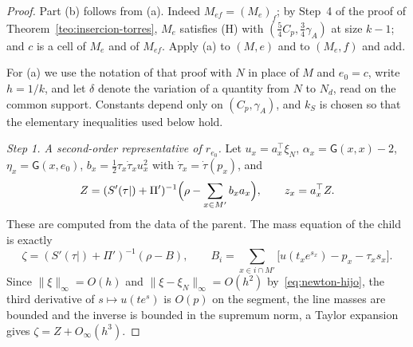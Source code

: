 \begin{proof}
Part (b) follows from (a). Indeed $M_{ef}=(M_e)_f$; by Step~4 of the proof of
Theorem~\ref{teo:insercion-torres}, $M_e$ satisfies \textup{(H)} with $(\tfrac54C_p,\tfrac34\gamma_A)$ at
size $k-1$; and $c$ is a cell of $M_e$ and of $M_{ef}$. Apply (a) to $(M,e)$ and to $(M_e,f)$ and add.

For (a) we use the notation of that proof with $N$ in place of $M$ and $e_0=c$, write $h=1/k$, and let
$\delta$ denote the variation of a quantity from $N$ to $N_d$, read on the common support. Constants
depend only on $(C_p,\gamma_A)$, and $k_S$ is chosen so that the elementary inequalities used below hold.

\emph{Step 1. A second-order representative of $r_{e_0}$.} Let $u_x=a_x^\top\xi_N$, $\alpha_x=\mathsf
G(x,x)-2$, $\eta_x=\mathsf G(x,e_0)$, $b_x=\tfrac12\tau_x\dot\tau_xu_x^2$ with $\dot\tau_x=\dot\tau(p_x)$,
and
\[
 Z=(S'(\tau|)+\Pi')^{-1}\Bigl(\rho-\sum_{x\in M'}b_xa_x\Bigr),\qquad z_x=a_x^\top Z .
\]
These are computed from the data of the parent. The mass equation of the child is exactly
\begin{equation}\label{eq:masas-hijo}
 \zeta=(S'(\tau|)+\Pi')^{-1}(\rho-B),\qquad
 B_i=\sum_{x\in i\cap M'}\bigl[u(t_xe^{s_x})-p_x-\tau_xs_x\bigr].
\end{equation}
Since $\|\xi\|_\infty=O(h)$ and $\|\xi-\xi_N\|_\infty=O(h^2)$ by~\eqref{eq:newton-hijo}, the third
derivative of $s\mapsto u(te^s)$ is $O(p)$ on the segment, the line masses are bounded and the inverse is
bounded in the supremum norm, a Taylor expansion gives $\zeta=Z+O_\infty(h^3)$.


\end{proof}

